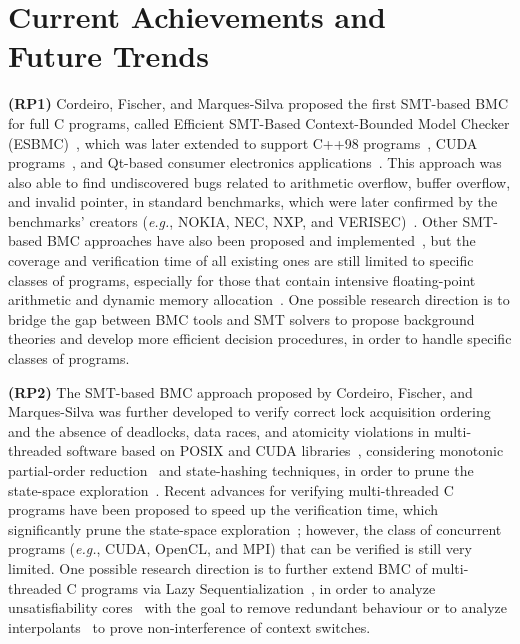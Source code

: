 \documentclass{acm_sen_article}
\begin{document}
\section{Current Achievements and \\ Future Trends}
\label{achievements}

\textbf{(RP1)} Cordeiro, Fischer, and Marques-Silva proposed the first SMT-based BMC for full C programs, called Efficient SMT-Based Context-Bounded Model Checker (ESBMC)~\cite{Cordeiro12}, which was later extended to support C++98 programs~\cite{ECBS13}, CUDA programs~\cite{Pereira15}, and Qt-based consumer electronics applications~\cite{Sousa15}. This approach was also able to find undiscovered bugs related to arithmetic overflow, buffer overflow, and invalid pointer, in standard benchmarks, which were later confirmed by the benchmarks' creators ({\it e.g.}, NOKIA, NEC, NXP, and VERISEC)~\cite{CordeiroF11,Cordeiro12}. Other SMT-based BMC approaches have also been proposed and implemented~\cite{MerzFS12}, but the coverage and verification time of all existing ones are still limited to specific classes of programs, especially for those that contain intensive floating-point arithmetic and dynamic memory allocation~\cite{Beyer14,BeyerSVCOMP15}. One possible research direction is to bridge the gap between BMC tools and SMT solvers to propose background theories and develop more efficient decision procedures, in order to handle specific classes of programs.

\textbf{(RP2)} The SMT-based BMC approach proposed by Cordeiro, Fischer, and Marques-Silva was further developed to verify correct lock acquisition ordering and the absence of deadlocks, data races, and atomicity violations in multi-threaded software based on POSIX and CUDA libraries~\cite{CordeiroF11,Pereira15}, considering monotonic partial-order reduction~\cite{KahlonWG09} and state-hashing techniques, in order to prune the state-space exploration~\cite{morse15}. Recent advances for verifying multi-threaded C programs have been proposed to speed up the verification time, which significantly prune the state-space exploration~\cite{Inverso14,civl15}; however, the class of concurrent programs ({\it e.g.}, CUDA, OpenCL, and MPI) that can be verified is still very limited. One possible research direction is to further extend BMC of multi-threaded C programs via Lazy Sequentialization~\cite{Inverso14}, in order to analyze unsatisfiability cores~\cite{Grumberg05} with the goal to remove redundant behaviour or to analyze interpolants~\cite{McMillan11} to prove non-interference of context switches.
\end{document}
